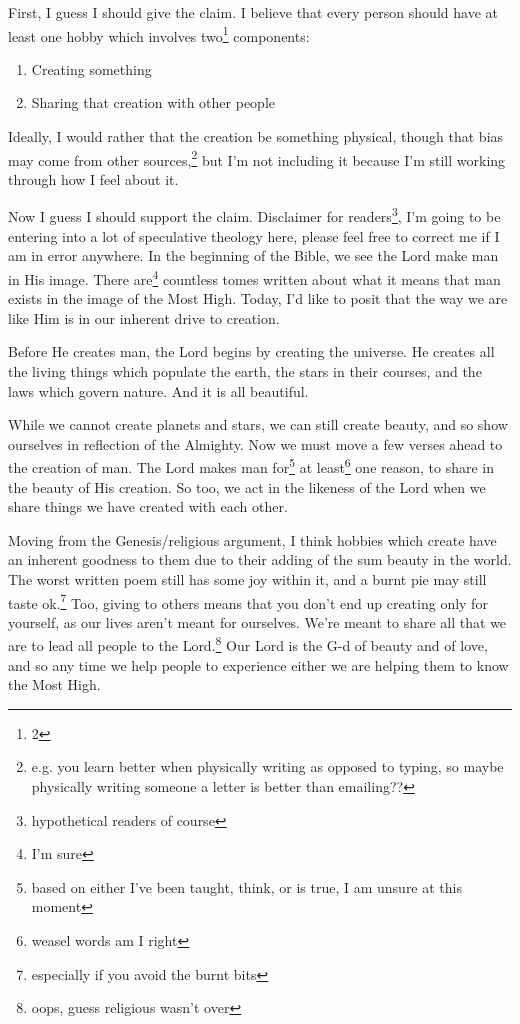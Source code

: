 \documentclass[12pt]{article}[titlepage]
\newcommand{\1}{\={a}}
\newcommand{\2}{\={e}}
\newcommand{\3}{\={\i}}
\newcommand{\4}{\=o}
\newcommand{\5}{\=u}
\newcommand{\6}{\={A}}
\renewcommand{\,}{\textsuperscript{,}}
\begin{document}
First, I guess I should give the claim.
I believe that every person should have at least one hobby which involves two\footnote{2} components:
\begin{enumerate}
\item Creating something
\item Sharing that creation with other people
\end{enumerate}
Ideally, I would rather that the creation be something physical, though that bias may come from other sources,\footnote{e.g. you learn better when physically writing as opposed to typing, so maybe physically writing someone a letter is better than emailing??} but I'm not including it because I'm still working through how I feel about it.

Now I guess I should support the claim.
Disclaimer for readers\footnote{hypothetical readers of course}, I'm going to be entering into a lot of speculative theology here, please feel free to correct me if I am in error anywhere.
In the beginning of the Bible, we see the Lord make man in His image.
There are\footnote{I'm sure} countless tomes written about what it means that man exists in the image of the Most High.
Today, I'd like to posit that the way we are like Him is in our inherent drive to creation.

Before He creates man, the Lord begins by creating the universe.
He creates all the living things which populate the earth, the stars in their courses, and the laws which govern nature.
And it is all beautiful.

While we cannot create planets and stars, we can still create beauty, and so show ourselves in reflection of the Almighty.
Now we must move a few verses ahead to the creation of man.
The Lord makes man for\footnote{based on either I've been taught, think, or is true, I am unsure at this moment} at least\footnote{weasel words am I right} one reason, to share in the beauty of His creation.
So too, we act in the likeness of the Lord when we share things we have created with each other.

Moving from the Genesis/religious argument, I think hobbies which create have an inherent goodness to them due to their adding of the sum beauty in the world.
The worst written poem still has some joy within it, and a burnt pie may still taste ok.\footnote{especially if you avoid the burnt bits}
Too, giving to others means that you don't end up creating only for yourself, as our lives aren't meant for ourselves.
We're meant to share all that we are to lead all people to the Lord.\footnote{oops, guess religious wasn't over}
Our Lord is the G-d of beauty and of love, and so any time we help people to experience either we are helping them to know the Most High.
\end{document}
